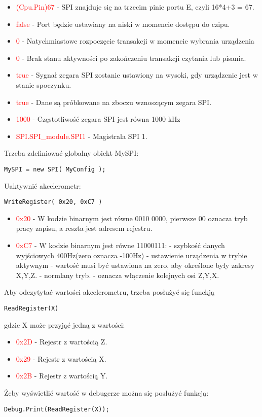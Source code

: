 \documentclass{article}
\begin{document}
\begin{itemize}
\item \textcolor{red}{(Cpu.Pin)67} - SPI znajduje się na trzecim pinie portu E, czyli 16*4+3 = 67.
\item \textcolor{red}{false} - Port będzie ustawiany na niski w momencie dostępu do czipu.
\item \textcolor{red}{0} - Natychmiastowe rozpoczęcie transakcji w momencie wybrania urządzenia
\item \textcolor{red}{0} - Brak stanu aktywności po zakończeniu transakcji czytania lub pisania.
\item \textcolor{red}{true} - Sygnał zegara SPI zostanie ustawiony na wysoki, gdy urządzenie jest w stanie spoczynku.
\item \textcolor{red}{true} -  Dane są próbkowane na zboczu wznoszącym zegara SPI.
\item \textcolor{red}{1000} -  Częstotliwość zegara SPI jest równa 1000 kHz
\item \textcolor{red}{SPI.SPI\_module.SPI1} - Magistrala SPI 1. 
\end{itemize}
Trzeba zdefiniować globalny obiekt MySPI:
\begin{lstlisting}[frame=single]
MySPI = new SPI( MyConfig );
\end{lstlisting}
Uaktywnić akcelerometr:
\begin{lstlisting}[frame=single]
WriteRegister( 0x20, 0xC7 )
\end{lstlisting}
\begin{itemize}
\item \textcolor{red}{0x20} -  W kodzie binarnym jest równe 0010 0000, pierwsze 00 oznacza tryb pracy zapisu, a reszta jest adresem rejestru.
\item \textcolor{red}{0xC7} -  W kodzie binarnym jest równe 11000111: 
 - szybkość danych wyjściowych 400Hz(zero oznacza -100Hz)
 - ustawienie urządzenia w trybie aktywnym
 - wartość musi być ustawiona na zero, aby określone były zakresy X,Y,Z.
 - normlany tryb.
 - oznacza włączenie kolejnych osi Z,Y,X.
\end{itemize}
Aby odczytytać wartości akcelerometru, trzeba posłużyć się funckją 
\begin{lstlisting}[frame=single]
ReadRegister(X)
\end{lstlisting}
gdzie X może przyjąć jedną z wartości:
\begin{itemize}
\item \textcolor{red}{0x2D} - Rejestr z wartością Z.
\item \textcolor{red}{0x29} - Rejestr z wartością X.
\item \textcolor{red}{0x2B} - Rejestr z wartością Y.
\end{itemize}
Żeby wyświetlić wartość w debugerze można się posłużyć funkcją:
\begin{lstlisting}[frame=single]
Debug.Print(ReadRegister(X));
\end{lstlisting}
\end{document}
